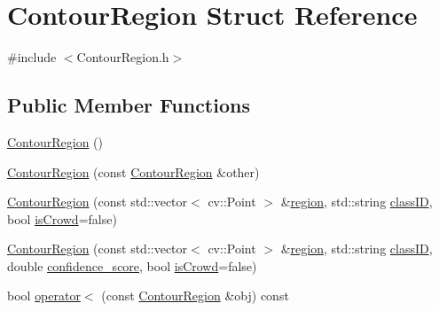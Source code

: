 \hypertarget{struct_contour_region}{}\section{Contour\+Region Struct Reference}
\label{struct_contour_region}


{\ttfamily \#include $<$Contour\+Region.\+h$>$}

\subsection*{Public Member Functions}
\begin{DoxyCompactItemize}
\item 
\hyperlink{struct_contour_region_a24b9b3e8e9eaf336089c0ba91b0579ca}{Contour\+Region} ()
\item 
\hyperlink{struct_contour_region_a8c5b1aa1ee317050828ebd5f53739285}{Contour\+Region} (const \hyperlink{struct_contour_region}{Contour\+Region} \&other)
\item 
\hyperlink{struct_contour_region_a90dad855c151582191accdcffa31e0cf}{Contour\+Region} (const std\+::vector$<$ cv\+::\+Point $>$ \&\hyperlink{struct_contour_region_a638a84fef2113ccf2016f29273f6992d}{region}, std\+::string \hyperlink{struct_contour_region_ada861b3bc539bf62d0344a5a2b1b06da}{class\+ID}, bool \hyperlink{struct_contour_region_a6bdf33777074f8498b55e3c89817906d}{is\+Crowd}=false)
\item 
\hyperlink{struct_contour_region_aa3acba5c43fdabd50f9b8bef282c12fc}{Contour\+Region} (const std\+::vector$<$ cv\+::\+Point $>$ \&\hyperlink{struct_contour_region_a638a84fef2113ccf2016f29273f6992d}{region}, std\+::string \hyperlink{struct_contour_region_ada861b3bc539bf62d0344a5a2b1b06da}{class\+ID}, double \hyperlink{struct_contour_region_a784f18630b662f78d2cb72ce44e2e763}{confidence\+\_\+score}, bool \hyperlink{struct_contour_region_a6bdf33777074f8498b55e3c89817906d}{is\+Crowd}=false)
\item 
bool \hyperlink{struct_contour_region_af815e79c137062f117656aada479a2d7}{operator$<$} (const \hyperlink{struct_contour_region}{Contour\+Region} \&obj) const
\end{DoxyCompactItemize}
